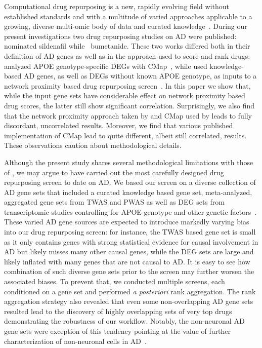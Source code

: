 \documentclass[letterpaper]{article}
\begin{document}
Computational drug repurposing is a new, rapidly evolving field without
established standards and with a multitude of varied approaches applicable to
a growing, diverse multi-omic body of data and curated
knowledge~\citep{Pushpakom2019}.  During our present investigations two drug
repurposing studies on AD were published: \cite{Fang2021} nominated sildenafil
while~\cite{Taubes2021} bumetanide.  These two works differed both in their
definition of AD genes as well as in the approach used to score and rank
drugs: \cite{Taubes2021} analyzed APOE genotype-specific DEGs with
CMap~\citep{Lamb2006}, while \cite{Fang2021} used knowledge-based AD genes, as
well as DEGs without known APOE genotype, as inputs to a network proximity
based drug repurposing screen~\citep{Cheng2018}.  In this paper we show that,
while the input gene sets have considerable effect on network proximity based
drug scores, the latter still show significant correlation.  Surprisingly, we
also find that the network proximity approach taken by \cite{Fang2021} and
CMap used by \cite{Taubes2021} leads to fully discordant, uncorrelated
results.  Moreover, we find that various published implementation of CMap lead
to quite different, albeit still correlated, results.  These observations
caution about methodological details.

Although the present study shares several methodological limitations with
those of \cite{Fang2021,Taubes2021}, we may argue to have carried out the most
carefully designed drug repurposing screen to date on AD.  We based our screen
on a diverse collection of AD gene sets that included a curated knowledge
based gene set, meta-analyzed, aggregated gene sets from TWAS and PWAS as well
as DEG sets from transcriptomic studies controlling for APOE genotype and
other genetic factors~\citep{Lin2018}.  These varied AD gene sources are
expected to introduce markedly varying bias into our drug repurposing screen: for
instance, the TWAS based gene set is small as it only contains genes with
strong statistical evidence for causal involvement in AD but likely misses
many other causal genes, while the DEG sets are large and likely inflated with
many genes that are not causal to AD.  It is easy to see how combination of
such diverse gene sets prior to the screen may further worsen the associated
biases. To prevent that, we conducted multiple screens, each conditioned on a
gene set and performed \emph{a posteriori} rank aggregation.  The rank
aggregation strategy also revealed that even some non-overlapping AD gene sets
resulted lead to the discovery of highly overlapping sets of very top drugs
demonstrating the robustness of our workflow.  Notably, the non-neuronal
AD gene sets were exception of this tendency pointing at the value of further
characterization of non-neuronal cells in
AD~\citep{Lopes2022,Mathys2019,DeStrooper2016}.
\end{document}
